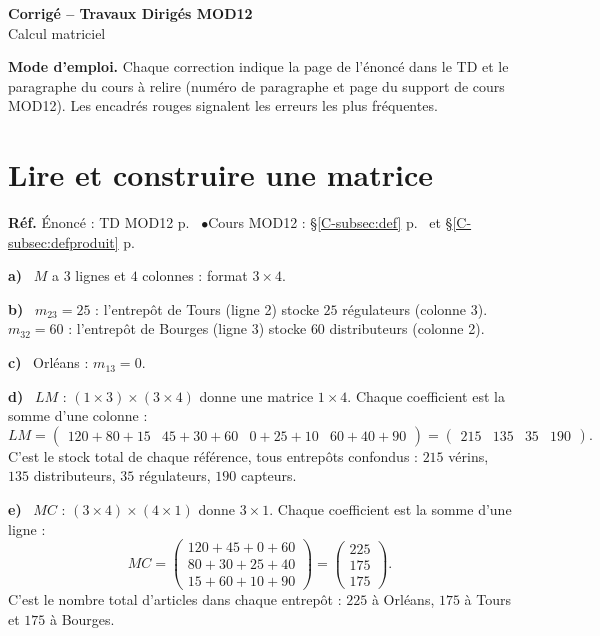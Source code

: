 \documentclass[a4paper,11pt]{article}
\newcommand{\M}[1]{\begin{pmatrix}#1\end{pmatrix}}
\newcommand{\cours}[1]{§\ref{C-#1} p.~\pageref{C-#1}}
\newcommand{\source}[2]{{\footnotesize\color{uimmgray}\textbf{Réf.} \enspace Énoncé : TD MOD12 p.~\pageref{T-#1} \enspace$\bullet$\enspace Cours MOD12 : #2}\par\smallskip}
\newcommand{\q}[1]{\textbf{\color{uimmblue}#1}\ }
\begin{document}
\begin{tcolorbox}[colback=uimmblue, colframe=uimmblue, sharp corners, boxrule=0pt,
  left=14pt, right=14pt, top=10pt, bottom=10pt]
{\color{white}\LARGE\bfseries Corrigé -- Travaux Dirigés MOD12}\\[4pt]
{\color{white}\large Calcul matriciel}
\end{tcolorbox}

\begin{tcolorbox}[colback=uimmlightgray, colframe=uimmgray, boxrule=0.8pt, arc=3pt]
\small\textbf{Mode d'emploi.} Chaque correction indique la page de l'énoncé dans le TD et le paragraphe du cours à relire (numéro de paragraphe et page du support de cours MOD12). Les encadrés rouges signalent les erreurs les plus fréquentes.
\end{tcolorbox}

\needspace{8cm}
\section{Lire et construire une matrice}

\begin{correction}
\source{exo:1}{\cours{subsec:def} et \cours{subsec:defproduit}}
\q{a)} $M$ a $3$ lignes et $4$ colonnes : format $3\times 4$.

\q{b)} $m_{23} = 25$ : l'entrepôt de Tours (ligne 2) stocke $25$ régulateurs (colonne 3).\\
$m_{32} = 60$ : l'entrepôt de Bourges (ligne 3) stocke $60$ distributeurs (colonne 2).

\q{c)} Orléans : $m_{13} = 0$.

\q{d)} $LM$ : $(1\times 3)\times(3\times 4)$ donne une matrice $1\times 4$. Chaque coefficient est la somme d'une colonne :
\[
LM = \M{120+80+15 & 45+30+60 & 0+25+10 & 60+40+90} = \M{215 & 135 & 35 & 190}.
\]
C'est le stock total de chaque référence, tous entrepôts confondus : $215$ vérins, $135$ distributeurs, $35$ régulateurs, $190$ capteurs.

\q{e)} $MC$ : $(3\times 4)\times(4\times 1)$ donne $3\times 1$. Chaque coefficient est la somme d'une ligne :
\[
MC = \M{120+45+0+60\\ 80+30+25+40\\ 15+60+10+90} = \M{225\\175\\175}.
\]
C'est le nombre total d'articles dans chaque entrepôt : $225$ à Orléans, $175$ à Tours et $175$ à Bourges.
\end{correction}
\end{document}
